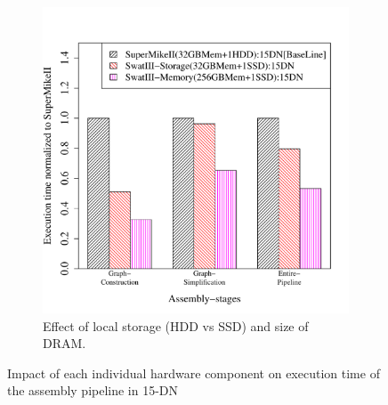 \documentclass[conference]{IEEEtran}
\begin{document}
\begin{figure}[htb]
\begin{subfigure}[b]{0.23\textwidth}
                \includegraphics[width=\textwidth]{Figure/PerormanceData/Plots/StorageMemory.pdf}
                \caption{Effect of local storage (HDD vs SSD) and size of DRAM.}
                \label{fig:SuperMikeSwatStorageMemory}
   \end{subfigure}
   \caption{Impact of each individual hardware component on execution time of the assembly pipeline in 15-DN }
  \label{fig:SuperMikeSwat}
  \vspace{-1.1em}
\end{figure}
\end{document}
